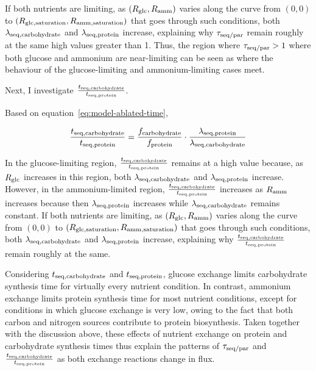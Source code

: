 If both nutrients are limiting, as $(R_{\mathrm{glc}}, R_{\mathrm{amm}})$ varies along the curve from $(0, 0)$ to $(R_{\mathrm{glc, saturation}}, R_{\mathrm{amm, saturation}})$ that goes through such conditions, both $\lambda_{\mathrm{seq},\mathrm{carbohydrate}}$ and $\lambda_{\mathrm{seq},\mathrm{protein}}$ increase, explaining why $\tau_{\mathrm{seq}/\mathrm{par}}$ remain roughly at the same high values greater than 1.
Thus, the region where $\tau_{\mathrm{seq}/\mathrm{par}} > 1$ where both glucose and ammonium are near-limiting can be seen as where the behaviour of the glucose-limiting and ammonium-limiting cases meet.

Next, I investigate $\frac{t_{\mathrm{seq},\mathrm{carbohydrate}}}{t_{\mathrm{seq},\mathrm{protein}}}$.

Based on equation~\ref{eq:model-ablated-time},

\begin{equation}
  \frac{t_{\mathrm{seq},\mathrm{carbohydrate}}}{t_{\mathrm{seq},\mathrm{protein}}} = \frac{f_{\mathrm{carbohydrate}}}{f_{\mathrm{protein}}} \cdot \frac{\lambda_{\mathrm{seq},\mathrm{protein}}}{\lambda_{\mathrm{seq},\mathrm{carbohydrate}}}
  \label{eq:model-carb-prot-ratio}
\end{equation}

In the glucose-limiting region, $\frac{t_{\mathrm{seq},\mathrm{carbohydrate}}}{t_{\mathrm{seq},\mathrm{protein}}}$ remains at a high value because, as $R_{\mathrm{glc}}$ increases in this region, both $\lambda_{\mathrm{seq},\mathrm{carbohydrate}}$ and $\lambda_{\mathrm{seq},\mathrm{protein}}$ increase.
However, in the ammonium-limited region, $\frac{t_{\mathrm{seq},\mathrm{carbohydrate}}}{t_{\mathrm{seq},\mathrm{protein}}}$ increases as $R_{\mathrm{amm}}$ increases because then $\lambda_{\mathrm{seq},\mathrm{protein}}$ increases while $\lambda_{\mathrm{seq},\mathrm{carbohydrate}}$ remains constant.
If both nutrients are limiting, as $(R_{\mathrm{glc}}, R_{\mathrm{amm}})$ varies along the curve from $(0, 0)$ to $(R_{\mathrm{glc, saturation}}, R_{\mathrm{amm, saturation}})$ that goes through such conditions, both $\lambda_{\mathrm{seq},\mathrm{carbohydrate}}$ and $\lambda_{\mathrm{seq},\mathrm{protein}}$ increase, explaining why $\frac{t_{\mathrm{seq},\mathrm{carbohydrate}}}{t_{\mathrm{seq},\mathrm{protein}}}$ remain roughly at the same.

Considering $t_{\mathrm{seq},\mathrm{carbohydrate}}$ and $t_{\mathrm{seq},\mathrm{protein}}$, glucose exchange limits carbohydrate synthesis time for virtually every nutrient condition.
In contrast, ammonium exchange limits protein synthesis time for most nutrient conditions, except for conditions in which glucose exchange is very low, owing to the fact that both carbon and nitrogen sources contribute to protein biosynthesis.
Taken together with the discussion above, these effects of nutrient exchange on protein and carbohydrate synthesis times thus explain the patterns of $\tau_{\mathrm{seq}/\mathrm{par}}$ and $\frac{t_{\mathrm{seq},\mathrm{carbohydrate}}}{t_{\mathrm{seq},\mathrm{protein}}}$ as both exchange reactions change in flux.


